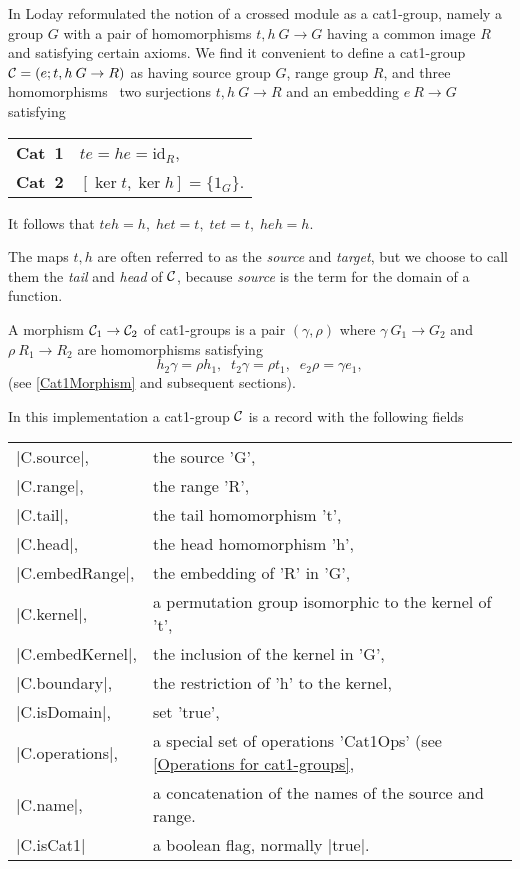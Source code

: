\newpage


%

In \cite{L1} Loday reformulated the notion of a 
crossed module as a cat1-group, 
namely a group $G$ with a pair of homomorphisms $t,h \: G \to G$
having  a common image $R$ and satisfying certain axioms.
We find it convenient to define a cat1-group 
${\cal C} = (e;t,h \: G \to R )$  as having source group  $G$,
range group $R$,  and three homomorphisms\: \  two surjections  
$t,h \: G \to R$  and an embedding  $e \: R \to G$  satisfying\:
\begin{center}
\begin{tabular}{r l}
\textbf{Cat\ 1\:}  &  $te = he = \mathrm{id}_R $, \\
\textbf{Cat\ 2\:}  &  $[\ker t, \ker h] = \{ 1_G \}$.
\end{tabular}
\end{center}
It follows that  $teh = h, \; het = t, \; tet = t, \; heh = h$.

The maps  $t,h$  are often referred to as the {\em source} and {\em target},
but we choose to call them the
{\em tail} and {\em head} of  ${\cal C}$, 
because {\em source} is the {\GAP} term for the domain of a function.


A morphism  ${\cal C}_1 \to {\cal C}_2$  
of cat1-groups is a pair  $(\gamma, \rho)$  where
$\gamma \: G_1 \to G_2$  and  $\rho \: R_1 \to R_2$  
are homomorphisms satisfying
$$
h_2 \gamma = \rho h_1, \;\; t_2 \gamma = \rho t_1, \;\; e_2 \rho = \gamma e_1,
$$
(see \ref{Cat1Morphism} and subsequent sections).

In this implementation a cat1-group $ {\cal C}$ 
is a record with the following fields\:

\begin{tabular}{ll}
|C.source|,     & the source 'G',                                      \\
|C.range|,      & the range 'R',                                       \\
|C.tail|,       & the tail homomorphism 't',                           \\
|C.head|,       & the head homomorphism 'h',                           \\
|C.embedRange|, & the embedding of 'R' in 'G',                         \\
|C.kernel|,     & a permutation group isomorphic to the kernel of 't', \\
|C.embedKernel|,& the inclusion of the kernel in 'G',                \\
|C.boundary|,   & the restriction of 'h' to the kernel,                \\
|C.isDomain|,   & set 'true',                                          \\
|C.operations|, & a special set of operations 'Cat1Ops'
                  (see \ref{Operations for cat1-groups}, \\
|C.name|,       & a concatenation of the names of the source and range.\\
|C.isCat1| & a boolean flag, normally |true|.
\end{tabular}

